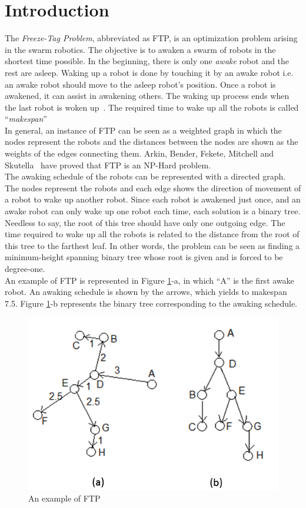 \documentclass{cccg12}
\begin{document}
\section{Introduction}
The \textit{Freeze-Tag Problem}, abbreviated as FTP, is an optimization problem arising in the swarm robotics. The objective is to awaken a swarm of robots in the shortest time possible. In the beginning, there is only one \textit{awake} robot and the rest are asleep. Waking up a robot is done by touching it by an awake robot i.e. an awake robot should move to the asleep robot's position. Once a robot is awakened, it can assist in awakening others. The waking up process ends when the last robot is woken up~\cite{Arkin2006}. The required time to wake up all the robots is called ``\textit{makespan}''\\
In general, an instance of FTP can be seen as a weighted graph in which the nodes represent the robots and the distances between the nodes are shown as the weights of the edges connecting them. Arkin, Bender, Fekete, Mitchell and Skutella~\cite{Arkin2006} have proved that FTP is an NP-Hard problem.\\
The awaking schedule of the robots can be represented with a directed graph. The nodes represent the robots and each edge shows the direction of movement of a robot to wake up another robot. Since each robot is awakened just once, and an awake robot can only wake up one robot each time, each solution is a binary tree. Needless to say, the root of this tree should have only one outgoing edge. The time required to wake up all the robots is related to the distance from the root of this tree to the farthest leaf. In other words, the problem can be seen as finding a minimum-height spanning binary tree whose root is given and is forced to be degree-one.\\
An example of FTP is represented in Figure \ref{fig:example}-a, in which ``A'' is the first awake robot. An awaking schedule is shown by the arrows, which yields to makespan 7.5. Figure \ref{fig:example}-b represents the binary tree corresponding to the awaking schedule.
\begin{figure}[h]
  \centering
  \includegraphics[scale=.5]{Figs/fig1.png}
  \caption{An example of FTP}
  \label{fig:example}
\end{figure}
\end{document}
